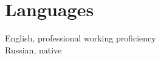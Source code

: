 \section{Languages}
\textsf{English}, professional working proficiency \\
\textsf{Russian}, native

